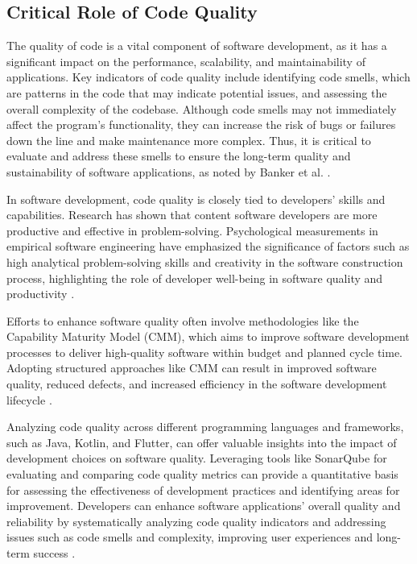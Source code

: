 \subsection{Critical Role of Code Quality}
The quality of code is a vital component of software development, as it has a significant impact on the performance, scalability, and maintainability of applications. Key indicators of code quality include identifying code smells, which are patterns in the code that may indicate potential issues, and assessing the overall complexity of the codebase. Although code smells may not immediately affect the program's functionality, they can increase the risk of bugs or failures down the line and make maintenance more complex. Thus, it is critical to evaluate and address these smells to ensure the long-term quality and sustainability of software applications, as noted by Banker et al. \cite{banker1998software}.
\par
In software development, code quality is closely tied to developers' skills and capabilities. Research has shown that content software developers are more productive and effective in problem-solving. Psychological measurements in empirical software engineering have emphasized the significance of factors such as high analytical problem-solving skills and creativity in the software construction process, highlighting the role of developer well-being in software quality and productivity \cite{graziotin2014happy}.
\par
Efforts to enhance software quality often involve methodologies like the Capability Maturity Model (CMM), which aims to improve software development processes to deliver high-quality software within budget and planned cycle time. Adopting structured approaches like CMM can result in improved software quality, reduced defects, and increased efficiency in the software development lifecycle \cite{agrawal2007software}.
\par
Analyzing code quality across different programming languages and frameworks, such as Java, Kotlin, and Flutter, can offer valuable insights into the impact of development choices on software quality. Leveraging tools like SonarQube for evaluating and comparing code quality metrics can provide a quantitative basis for assessing the effectiveness of development practices and identifying areas for improvement. Developers can enhance software applications' overall quality and reliability by systematically analyzing code quality indicators and addressing issues such as code smells and complexity, improving user experiences and long-term success \cite{graziotin2018happens}.

